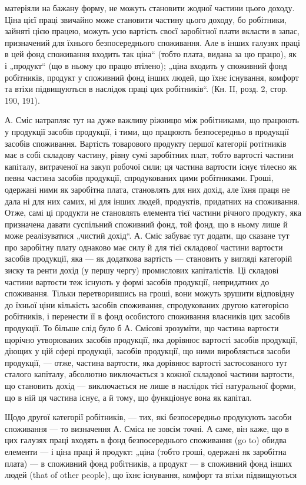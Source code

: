 \parcont{}  %
матеріяли на бажану форму, не можуть становити жодної частини цього
доходу. Ціна цієї праці звичайно може становити частину цього доходу,
бо робітники, зайняті цією працею, можуть усю вартість своєї заробітної
плати вкласти в запас, призначений для їхнього безпосереднього споживання.
Але в інших галузях праці в цей фонд споживання входить так
ціна“ (тобто плата, видана за цю працю), як і „продукт“ (що в
ньому цю працю втілено); „ціна входить у споживний фонд робітників,
продукт у споживний фонд інших людей, що їхнє існування, комфорт
та втіхи підвищуються в наслідок праці цих робітників“. (Кн. II, розд. 2,
стор. 190, 191).

А. Сміс натрапляє тут на дуже важливу ріжницю між робітниками,
що працюють у продукції засобів продукції, і тими, що працюють
безпосередньо в продукції засобів споживання. Вартість
товарового продукту першої категорії ротітників має в собі складову
частину, рівну сумі заробітних плат, тобто вартості частини капіталу,
витраченої на закуп робочої сили; ця частина вартости існує тілесно як
певна частина засобів продукції, спродукованих цими робітниками. Гроші,
одержані ними як заробітна плата, становлять для них дохід, але їхня
праця не дала ні для них самих, ні для інших людей, продуктів, придатних
на споживання. Отже, самі ці продукти не становлять елемента
тієї частини річного продукту, яка призначена давати суспільний споживний
фонд, той фонд, що в ньому лише й може реалізуватися „чистий
дохід“. А. Сміс забуває тут додати, що сказане тут про заробітну
плату однаково має силу й для тієї складової частини вартости засобів
продукції, яка — як додаткова вартість — становить у вигляді категорій
зиску та ренти дохід (у першу чергу) промислових капіталістів. Ці складові
частини вартости теж існують у формі засобів продукції, непридатних
до споживання. Тільки перетворившись на гроші, вони можуть
зрушити відповідну до їхньої ціни кількість засобів споживання, спродукованих
другою категорією робітників, і перенести її в фонд особистого
споживання власників цих засобів продукції. То більше слід було б
А. Смісові зрозуміти, що частина вартости щорічно утворюваних засобів
продукції, яка дорівнює вартості засобів продукції, діющих у цій сфері
продукції, засобів продукції, що ними виробляється засоби продукції, —
отже, частина вартости, яка дорівнює вартості застосованого тут сталого
капіталу, абсолютно виключається з кожної складової частини вартости,
що становить дохід — виключається не лише в наслідок тієї натуральної
форми, що в ній ця частина існує, а й тому, що функціонує вона як
капітал.

Щодо другої категорії робітників, — тих, які безпосередньо продукують
засоби споживання — то визначення А. Сміса не зовсім точні.
А саме, він каже, що в цих галузях праці входять в фонд безпосереднього
споживання (go to) обидва елементи — і ціна праці й продукт:
„ціна (тобто гроші, одержані як заробітна плата) — в споживний фонд
робітників, а продукт — в споживний фонд інших людей
(that of other people), що їхнє існування, комфорт та втіхи підвищуються
\parbreak{}  %

